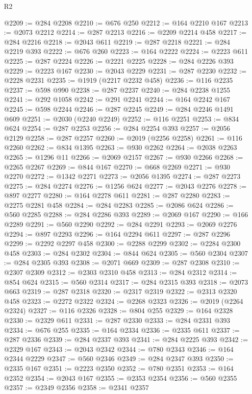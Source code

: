 \begin{lexlean}{R2}
\begin{coremodule}
@2209 := @284 @2208
@2210 := @676 @250
@2212 := @164 @2210 @167
@2213 := @2073 @2212
@2214 := @287 @2213
@2216 := @2209 @2214 @458
@2217 := @284 @2216
@2218 := @2043 @611
@2219 := @287 @2218
@2221 := @284 @2219 @393
@2222 := @676 @260
@2223 := @164 @2222
@2224 := @2223 @611
@2225 := @287 @2224
@2226 := @2221 @2225
@2228 := @284 @2226 @393
@2229 := @2223 @167
@2230 := @2043 @2229
@2231 := @287 @2230
@2232 := @2228 @2231
@2235 := @1919 (@2217 @2232 @458)
@2236 := @116 @2235
@2237 := @598 @990
@2238 := @287 @2237
@2240 := @284 @2238 @1255
@2241 := @292 @1058
@2242 := @291 @2241
@2244 := @164 @2242 @167
@2245 := @598 @2244
@2246 := @287 @2245
@2249 := @284 @2246 @1491 @609
@2251 := @2030 (@2240 @2249)
@2252 := @116 @2251
@2253 := @834 @624
@2254 := @287 @2253
@2256 := @284 @2254 @393
@2257 := @2056 @2129
@2258 := @287 @2257
@2260 := @2019 (@2256 @2258)
@2261 := @116 @2260
@2262 := @834 @1395
@2263 := @930 @2262
@2264 := @2038 @2263
@2265 := @1296 @11
@2266 := @2069 @2157
@2267 := @930 @2266
@2268 := @2265 @2267
@2269 := @844 @167
@2270 := @668 @2269
@2271 := @930 @2270
@2272 := @1342 @2271
@2273 := @2056 @1395
@2274 := @287 @2273
@2275 := @284 @2274
@2276 := @1256 @624
@2277 := @2043 @2276
@2278 := @897 @2277
@2280 := @164 @2278 @611
@2281 := @287 @2280
@2283 := @2275 @2281 @458
@2284 := @284 @2283
@2285 := @2086 @624
@2286 := @560 @2285
@2288 := @284 @2286 @393
@2289 := @2069 @167
@2290 := @166 @2289
@2291 := @560 @2290
@2292 := @284 @2291
@2293 := @2069 @2276
@2294 := @897 @2293
@2296 := @164 @2294 @611
@2297 := @287 @2296
@2299 := @2292 @2297 @458
@2300 := @2288 @2299
@2302 := @2284 @2300 @458
@2303 := @284 @2302
@2304 := @844 @624
@2305 := @560 @2304
@2307 := @284 @2305 @393
@2308 := @2071 @669
@2309 := @287 @2308
@2310 := @2307 @2309
@2312 := @2303 @2310 @458
@2313 := @284 @2312
@2314 := @854 @624
@2315 := @560 @2314
@2317 := @284 @2315 @393
@2318 := @2073 @663
@2319 := @287 @2318
@2320 := @2317 @2319
@2322 := @2313 @2320 @458
@2323 := @2272 @2322
@2324 := @2268 @2323
@2326 := @2019 (@2264 @2324)
@2327 := @116 @2326
@2328 := @804 @255
@2329 := @164 @2328
@2330 := @2329 @611
@2331 := @287 @2330
@2333 := @284 @2331 @393
@2334 := @676 @255
@2335 := @164 @2334
@2336 := @2335 @611
@2337 := @287 @2336
@2339 := @284 @2337 @393
@2341 := @284 @2225 @393
@2342 := @2329 @167
@2343 := @2043 @2342
@2344 := @780 @2343
@2346 := @164 @2344 @2229
@2347 := @560 @2346
@2349 := @284 @2347 @393
@2350 := @2335 @167
@2351 := @2223 @2350
@2352 := @780 @2351
@2353 := @164 @2352
@2354 := @2043 @167
@2355 := @2353 @2354
@2356 := @560 @2355
@2357 := @2349 @2356
@2358 := @2341 @2357

\end{coremodule}
\end{lexlean}
